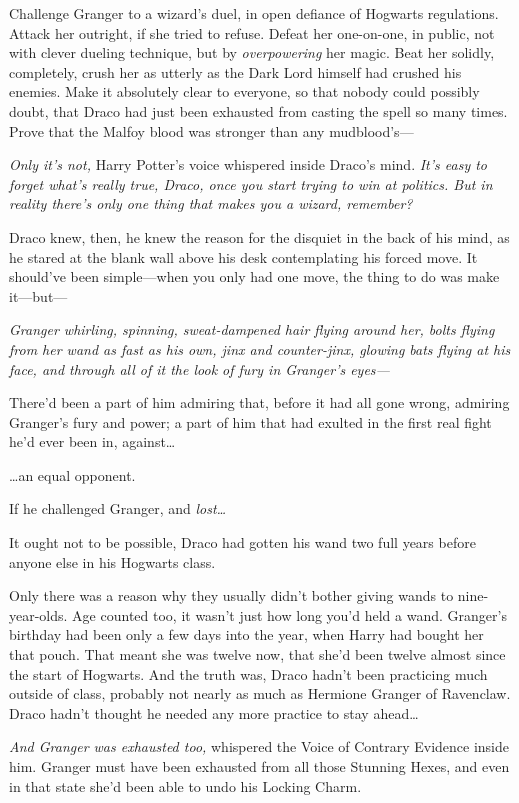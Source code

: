 Challenge Granger to a wizard's duel, in open defiance of Hogwarts regulations. 
Attack her outright, if she tried to refuse. Defeat her one-on-one, in public, 
not with clever dueling technique, but by \emph{overpowering} her magic. Beat 
her solidly, completely, crush her as utterly as the Dark Lord himself had 
crushed his enemies. Make it absolutely clear to everyone, so that nobody could 
possibly doubt, that Draco had just been exhausted from casting the spell so 
many times. Prove that the Malfoy blood was stronger than any mudblood's---

\emph{Only it's not,} Harry Potter's voice whispered inside Draco's mind. 
\emph{It's easy to forget what's really true, Draco, once you start trying to 
win at politics. But in reality there's only one thing that makes you a wizard, 
remember?}

Draco knew, then, he knew the reason for the disquiet in the back of his mind, 
as he stared at the blank wall above his desk contemplating his forced move. It 
should've been simple---when you only had one move, the thing to do was make 
it---but---

\emph{Granger whirling, spinning, sweat-dampened hair flying around her, bolts 
flying from her wand as fast as his own, jinx and counter-jinx, glowing bats 
flying at his face, and through all of it the look of fury in Granger's eyes---}

There'd been a part of him admiring that, before it had all gone wrong, 
admiring Granger's fury and power; a part of him that had exulted in the first 
real fight he'd ever been in, against{\ldots}

{\ldots}an equal opponent.

If he challenged Granger, and \emph{lost{\ldots}}

It ought not to be possible, Draco had gotten his wand two full years before 
anyone else in his Hogwarts class.

Only there was a reason why they usually didn't bother giving wands to 
nine-year-olds. Age counted too, it wasn't just how long you'd held a wand. 
Granger's birthday had been only a few days into the year, when Harry had 
bought her that pouch. That meant she was twelve now, that she'd been twelve 
almost since the start of Hogwarts. And the truth was, Draco hadn't been 
practicing much outside of class, probably not nearly as much as Hermione 
Granger of Ravenclaw. Draco hadn't thought he needed any more practice to stay 
ahead{\ldots}

\emph{And Granger was exhausted too,} whispered the Voice of Contrary Evidence 
inside him. Granger must have been exhausted from all those Stunning Hexes, and 
even in that state she'd been able to undo his Locking Charm.

